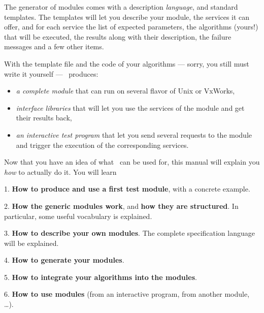 \bigbreak

The generator  of modules comes  with  a description \emph{language},  and
standard templates.  The templates will let you describe your module, the
services  it  can offer, and  for   each  service the  list  of  expected
parameters,  the algorithms (yours!) that will  be  executed, the results
along with their description, the failure messages and a few other items.

With the template file and the code of your algorithms --- sorry, you still
must write it yourself --- \GenoM\ produces:

\begin{itemize}
   \item \emph{a complete module} that can run on several flavor of Unix
or VxWorks, 
   \item \emph{interface libraries} that will let you use the services of
the module and get their results back,
   \item \emph{an interactive test program} that let you send several
requests to the module and trigger the execution of the corresponding
services.
\end{itemize}

\bigbreak

Now that you  have an idea  of what \GenoM\ can  be used for, this manual
will explain you \emph{how} to actually do it. You will learn

\begin{center}\begin{cartouche}\parbox{0.9\hsize}{
\parskip10pt
    1. \textbf{How to produce and use a first test module}, with a concrete
example.

    2. \textbf{How the generic modules work}, and \textbf{how they are
structured}. In particular, some useful vocabulary is explained.

    3. \textbf{How to describe your own modules}. The complete
specification language will be explained.

    4. \textbf{How to generate your modules}.

    5. \textbf{How to integrate your algorithms into the modules}.

    6. \textbf{How to use modules} (from an interactive program, from
another module, \ldots).
}\end{cartouche}\end{center}

